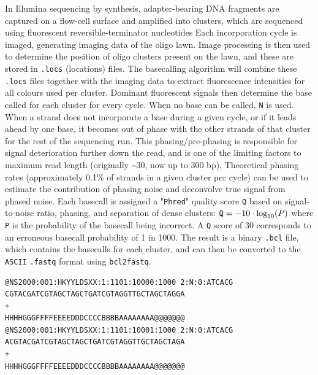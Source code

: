 In Illumina sequencing by synthesis, adapter-bearing DNA fragments are captured on a flow-cell surface and amplified into clusters, which are sequenced using fluorescent reversible-terminator nucleotides Each incorporation cycle is imaged, generating imaging data of the oligo lawn. Image processing is then used to determine the position of oligo clusters present on the lawn, and these are stored in \verb|.locs| (locations) files. The basecalling algorithm will combine these \verb|.locs| files together with the imaging data to extract fluorescence intensities for all colours used per cluster. Dominant fluorescent signals then determine the base called for each cluster for every cycle. When no base can be called, \verb|N| is used. When a strand does not incorporate a base during a given cycle, or if it leads ahead by one base, it becomes out of phase with the other strands of that cluster for the rest of the sequencing run. This phasing/pre-phasing is responsible for signal deterioration further down the read, and is one of the limiting factors to maximum read length (originally \textasciitilde{30}, now up to 300 bp). Theoretical phasing rates (approximately 0.1\% of strands in a given cluster per cycle) can be used to estimate the contribution of phasing noise and deconvolve true signal from phased noise. Each basecall is assigned a "\verb|Phred|" quality score \verb|Q| based on signal-to-noise ratio, phasing, and separation of dense clusters: \( \verb|Q| = -10 \cdot \log_{10} (P) \) where \verb|P| is the probability of the basecall being incorrect. A \verb|Q| score of 30 corresponds to an erroneous basecall probability of 1 in 1000. The result is a binary \verb|.bcl| file, which contains the basecalls for each cluster, and can then be converted to the \verb|ASCII| \verb|.fastq| format using \verb|bcl2fastq|.

\begin{center}
	\begin{minipage}{\linewidth}
		\begin{lstlisting}
@NS2000:001:HKYYLDSXX:1:1101:10000:1000 2:N:0:ATCACG
CGTACGATCGTAGCTAGCTGATCGTAGGTTGCTAGCTAGGA
+
HHHHGGGFFFFEEEEDDDCCCCBBBBAAAAAAAA@@@@@@@
@NS2000:001:HKYYLDSXX:1:1101:10001:1000 2:N:0:ATCACG 
ACGTACGATCGTAGCTAGCTGATCGTAGGTTGCTAGCTAGA
+
HHHHGGGFFFFEEEEDDDCCCCBBBBAAAAAAAA@@@@@@@
\end{lstlisting}
		\label{fig:fastq}
	\end{minipage}
\end{center}

